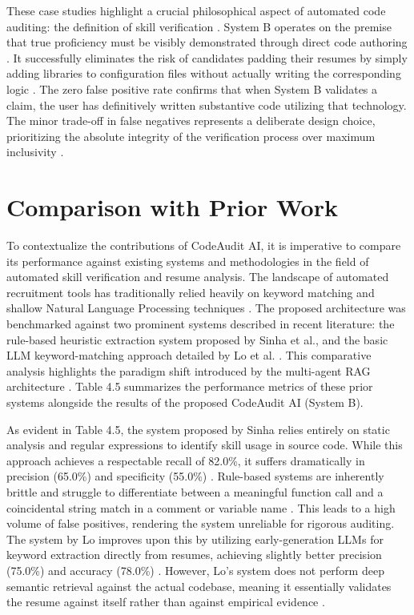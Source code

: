 These case studies highlight a crucial philosophical aspect of automated code auditing: the definition of skill verification \cite{ref48}. System B operates on the premise that true proficiency must be visibly demonstrated through direct code authoring \cite{ref3}. It successfully eliminates the risk of candidates padding their resumes by simply adding libraries to configuration files without actually writing the corresponding logic \cite{ref46, ref16}. The zero false positive rate confirms that when System B validates a claim, the user has definitively written substantive code utilizing that technology. The minor trade-off in false negatives represents a deliberate design choice, prioritizing the absolute integrity of the verification process over maximum inclusivity \cite{ref5}.

\section{Comparison with Prior Work}

To contextualize the contributions of CodeAudit AI, it is imperative to compare its performance against existing systems and methodologies in the field of automated skill verification and resume analysis. The landscape of automated recruitment tools has traditionally relied heavily on keyword matching and shallow Natural Language Processing techniques \cite{ref27, ref26}. The proposed architecture was benchmarked against two prominent systems described in recent literature: the rule-based heuristic extraction system proposed by Sinha et al., and the basic LLM keyword-matching approach detailed by Lo et al. \cite{ref47}. This comparative analysis highlights the paradigm shift introduced by the multi-agent RAG architecture \cite{ref33, ref9}. Table 4.5 summarizes the performance metrics of these prior systems alongside the results of the proposed CodeAudit AI (System B).

As evident in Table 4.5, the system proposed by Sinha relies entirely on static analysis and regular expressions to identify skill usage in source code. While this approach achieves a respectable recall of 82.0\%, it suffers dramatically in precision (65.0\%) and specificity (55.0\%) \cite{ref61}. Rule-based systems are inherently brittle and struggle to differentiate between a meaningful function call and a coincidental string match in a comment or variable name \cite{ref55, ref53}. This leads to a high volume of false positives, rendering the system unreliable for rigorous auditing. The system by Lo improves upon this by utilizing early-generation LLMs for keyword extraction directly from resumes, achieving slightly better precision (75.0\%) and accuracy (78.0\%) \cite{ref45}. However, Lo's system does not perform deep semantic retrieval against the actual codebase, meaning it essentially validates the resume against itself rather than against empirical evidence \cite{ref67, ref42}.

